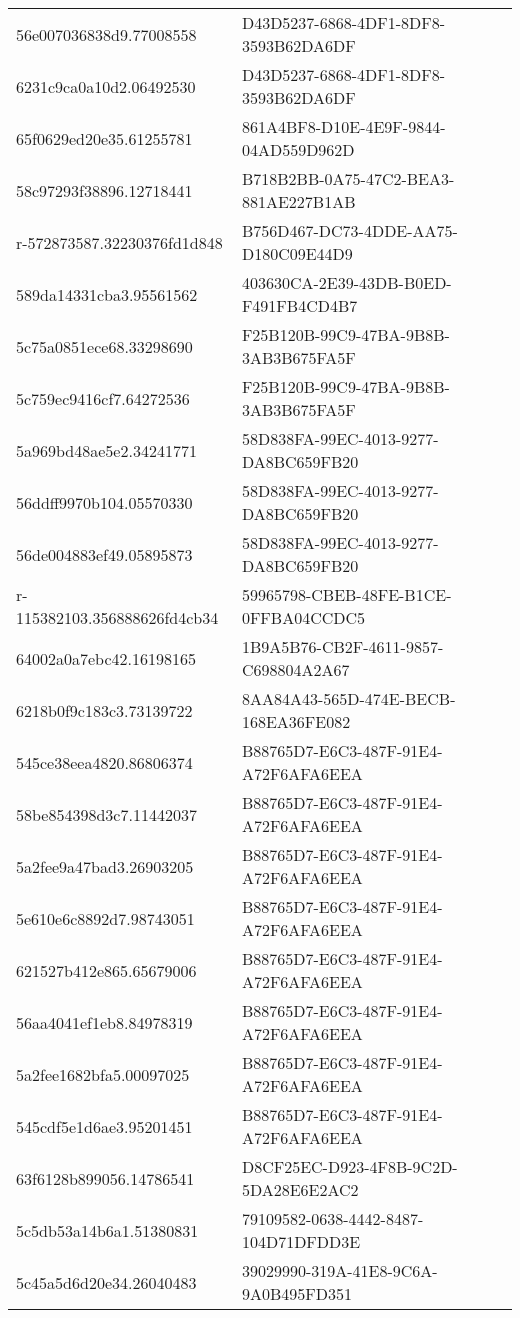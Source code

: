 \begin{tabular}{ll}
56e007036838d9.77008558 & D43D5237-6868-4DF1-8DF8-3593B62DA6DF \\
6231c9ca0a10d2.06492530 & D43D5237-6868-4DF1-8DF8-3593B62DA6DF \\
65f0629ed20e35.61255781 & 861A4BF8-D10E-4E9F-9844-04AD559D962D \\
58c97293f38896.12718441 & B718B2BB-0A75-47C2-BEA3-881AE227B1AB \\
r-572873587.32230376fd1d848 & B756D467-DC73-4DDE-AA75-D180C09E44D9 \\
589da14331cba3.95561562 & 403630CA-2E39-43DB-B0ED-F491FB4CD4B7 \\
5c75a0851ece68.33298690 & F25B120B-99C9-47BA-9B8B-3AB3B675FA5F \\
5c759ec9416cf7.64272536 & F25B120B-99C9-47BA-9B8B-3AB3B675FA5F \\
5a969bd48ae5e2.34241771 & 58D838FA-99EC-4013-9277-DA8BC659FB20 \\
56ddff9970b104.05570330 & 58D838FA-99EC-4013-9277-DA8BC659FB20 \\
56de004883ef49.05895873 & 58D838FA-99EC-4013-9277-DA8BC659FB20 \\
r-115382103.356888626fd4cb34 & 59965798-CBEB-48FE-B1CE-0FFBA04CCDC5 \\
64002a0a7ebc42.16198165 & 1B9A5B76-CB2F-4611-9857-C698804A2A67 \\
6218b0f9c183c3.73139722 & 8AA84A43-565D-474E-BECB-168EA36FE082 \\
545ce38eea4820.86806374 & B88765D7-E6C3-487F-91E4-A72F6AFA6EEA \\
58be854398d3c7.11442037 & B88765D7-E6C3-487F-91E4-A72F6AFA6EEA \\
5a2fee9a47bad3.26903205 & B88765D7-E6C3-487F-91E4-A72F6AFA6EEA \\
5e610e6c8892d7.98743051 & B88765D7-E6C3-487F-91E4-A72F6AFA6EEA \\
621527b412e865.65679006 & B88765D7-E6C3-487F-91E4-A72F6AFA6EEA \\
56aa4041ef1eb8.84978319 & B88765D7-E6C3-487F-91E4-A72F6AFA6EEA \\
5a2fee1682bfa5.00097025 & B88765D7-E6C3-487F-91E4-A72F6AFA6EEA \\
545cdf5e1d6ae3.95201451 & B88765D7-E6C3-487F-91E4-A72F6AFA6EEA \\
63f6128b899056.14786541 & D8CF25EC-D923-4F8B-9C2D-5DA28E6E2AC2 \\
5c5db53a14b6a1.51380831 & 79109582-0638-4442-8487-104D71DFDD3E \\
5c45a5d6d20e34.26040483 & 39029990-319A-41E8-9C6A-9A0B495FD351 \\

\end{tabular}
